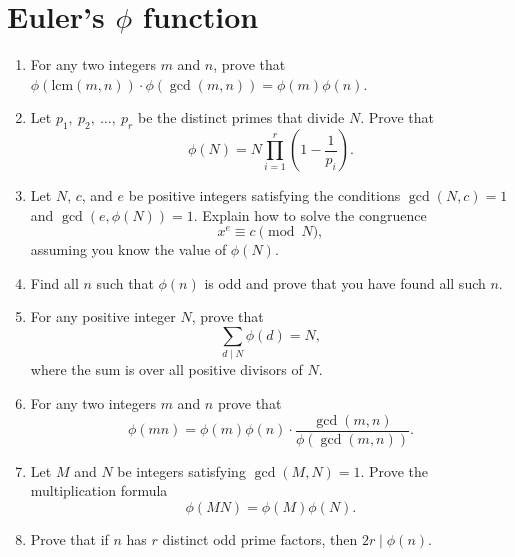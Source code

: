 \documentclass[11pt,letterpaper]{article}
\newcommand{\lcm}{\text{lcm}}
\begin{document}
\section{Euler's $\phi$ function}
\begin{enumerate}
    \item For any two integers $m$ and $n$, prove that $\phi(\lcm(m,n))\cdot \phi(\gcd(m,n)) = \phi(m)\phi(n)$.

    \item Let $p_1,\ p_2,\ \ldots,\ p_r$ be the distinct primes that divide $N$.
    Prove that
    \[
        \phi(N) = N\prod_{i=1}^r\left(1 - \frac{1}{p_i}\right).
    \]

    \item Let $N$, $c$, and $e$ be positive integers satisfying the conditions $\gcd(N, c) = 1$ and $\gcd(e, \phi(N)) = 1$.
    Explain how to solve the congruence
    \[
        x^e\equiv c\pmod N,
    \]
    assuming you know the value of $\phi(N)$.

    \item Find all $n$ such that $\phi(n)$ is odd and prove that you have found all such $n$.

    \item For any positive integer $N$, prove that
    \[
        \sum_{d\mid N}\phi(d) = N,
    \]
    where the sum is over all positive divisors of $N$.

    \item For any two integers $m$ and $n$ prove that
    \[
        \phi(mn) = \phi(m)\phi(n)\cdot \frac{\gcd(m,n)}{\phi(\gcd(m,n))}.
    \]

    \item Let $M$ and $N$ be integers satisfying $\gcd(M, N) = 1$.
    Prove the multiplication formula
    \[
        \phi(MN) = \phi(M)\phi(N).
    \]

    \item Prove that if $n$ has $r$ distinct odd prime factors, then $2r\mid \phi(n)$.


\end{enumerate}
\end{document}
